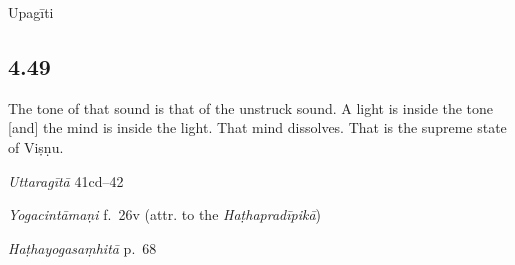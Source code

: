 \begin{ekdosis}



\begin{metre}[hp04_048]
Upagīti 
\end{metre}


\subsection*{4.49}
\begin{translation}[hp04_049]
The tone of that sound is that of the unstruck sound. A light is inside the tone [and] the mind is inside the light. That mind dissolves. That is the supreme state of Viṣṇu.
\end{translation}

\begin{sources}[hp04_049]
\emph{Uttaragītā} 41cd–42 %
\begin{versinnote}
\end{versinnote}
\end{sources}

\begin{testimonia}[hp04_049]
\emph{Yogacintāmaṇi} f.~26v (attr. to the \emph{Haṭhapradīpikā})
\begin{versinnote}
\end{versinnote}

\emph{Haṭhayogasaṃhitā} p.~68
\begin{versinnote}
\end{versinnote}
\end{testimonia}


\end{ekdosis}
